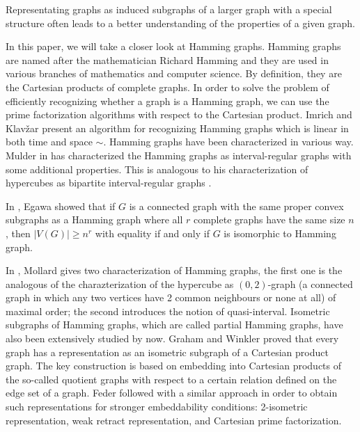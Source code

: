 \documentclass[12pt,a4paper,titlepage,openany]{report}
\begin{document}
Representating graphs as induced subgraphs of a larger graph with a special structure often leads to a better understanding of the properties of a given graph. 

In this paper, we will take a closer look at Hamming graphs. Hamming graphs are named after the mathematician Richard Hamming and they are used in various branches of mathematics and computer science. By definition, they are the Cartesian products of complete graphs. In order to solve the problem of efficiently recognizing whether a graph is a Hamming graph, we can use the prime factorization algorithms with respect to the Cartesian product. Imrich and Klav\v zar present an algorithm for recognizing Hamming graphs which is linear in both time and space $\sim$\cite{Imrich}.\newline
Hamming graphs have been characterized in various way. Mulder in \cite{Mulder} has characterized the Hamming graphs as interval-regular graphs with some additional properties. This is analogous to his characterization of hypercubes as bipartite interval-regular graphs \cite{Mulder}.

 In \cite{Egawa}, Egawa showed that if $G$ is a connected graph with the same proper convex subgraphs as a Hamming graph where all $r$ complete graphs have the same size $n$, then $|V(G)|\geq n^r$ with equality if and only if $G$ is isomorphic to Hamming graph. 
 
 In \cite{Mollard}, Mollard gives two characterization of Hamming graphs, the first one is the analogous of the charazterization of the hypercube as $(0,2)$-graph (a connected graph in which any two vertices have 2 common neighbours or none at all) of maximal order; the second introduces the notion of quasi-interval. Isometric subgraphs of Hamming graphs, which are called partial Hamming graphs, have also been extensively studied by now. \newline
Graham and Winkler \cite{Graham} proved that every graph has a representation as an isometric subgraph of a Cartesian product graph. The key construction is based on embedding into Cartesian products of the so-called quotient graphs with respect to a certain relation defined on the edge set of a graph. Feder \cite{Feder} followed with a similar approach in order to obtain such representations for stronger embeddability conditions: 2-isometric representation, weak retract representation, and Cartesian prime factorization. 
\end{document}
